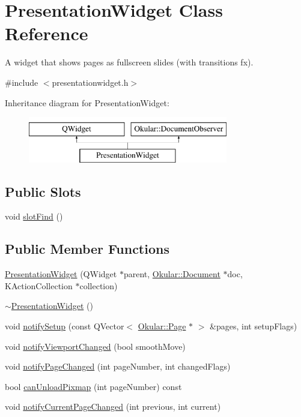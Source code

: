 \hypertarget{classPresentationWidget}{\section{Presentation\+Widget Class Reference}
\label{classPresentationWidget}
}


A widget that shows pages as fullscreen slides (with transitions fx).  




{\ttfamily \#include $<$presentationwidget.\+h$>$}

Inheritance diagram for Presentation\+Widget\+:\begin{figure}[H]
\begin{center}
\leavevmode
\includegraphics[height=2.000000cm]{classPresentationWidget}
\end{center}
\end{figure}
\subsection*{Public Slots}
\begin{DoxyCompactItemize}
\item 
void \hyperlink{classPresentationWidget_a4488b5ed4958497c9c07e9e5478c4b13}{slot\+Find} ()
\end{DoxyCompactItemize}
\subsection*{Public Member Functions}
\begin{DoxyCompactItemize}
\item 
\hyperlink{classPresentationWidget_acf3c7673d921c8a12a9e1f2ba325bf56}{Presentation\+Widget} (Q\+Widget $\ast$parent, \hyperlink{classOkular_1_1Document}{Okular\+::\+Document} $\ast$doc, K\+Action\+Collection $\ast$collection)
\item 
\hyperlink{classPresentationWidget_acfb166d318c2f302155db66027ed6542}{$\sim$\+Presentation\+Widget} ()
\item 
void \hyperlink{classPresentationWidget_a3bd0def67af18fd092301adfdb9f98a7}{notify\+Setup} (const Q\+Vector$<$ \hyperlink{classOkular_1_1Page}{Okular\+::\+Page} $\ast$ $>$ \&pages, int setup\+Flags)
\item 
void \hyperlink{classPresentationWidget_ac52c978b325991707aebbc0f99ffff27}{notify\+Viewport\+Changed} (bool smooth\+Move)
\item 
void \hyperlink{classPresentationWidget_a40b4d1dc7949527832d772699cbbf1a0}{notify\+Page\+Changed} (int page\+Number, int changed\+Flags)
\item 
bool \hyperlink{classPresentationWidget_a7e4a68278443b8b2be83234cd28afbd4}{can\+Unload\+Pixmap} (int page\+Number) const 
\item 
void \hyperlink{classPresentationWidget_a54be819b15799a923345a8dc7f4b0333}{notify\+Current\+Page\+Changed} (int previous, int current)
\end{DoxyCompactItemize}
